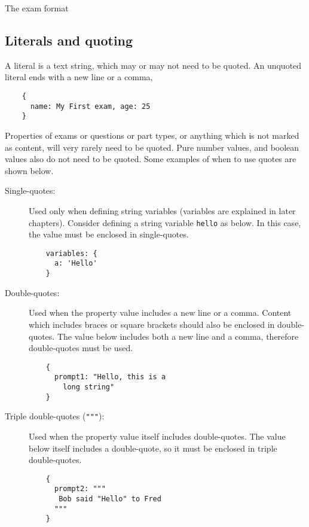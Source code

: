 \begin{chapter}{\label{cha:examformat}The exam format}
  \subsection{\label{sec:literals_quoting}Literals and quoting}
  A literal is a text string, which may or may not need to be quoted.  An
  unquoted literal ends with a new line or a comma, \eg
  \begin{Verbatim}
    {
      name: My First exam, age: 25
    }
  \end{Verbatim}
  Properties of exams or questions or part types, or anything which is not
  marked as content, will very rarely need to be quoted.  Pure number values,
  and boolean values also do not need to be quoted.  Some examples of when to
  use quotes are shown below.
  \begin{description}
    \item[Single-quotes:] Used only when defining string variables (variables
      are explained in later chapters).  Consider defining a string variable
      \verb"hello" as below.  In this case, the value must be enclosed in
      single-quotes.
      \begin{Verbatim}
    variables: {
      a: 'Hello'
    }
      \end{Verbatim}
    \item[Double-quotes:] Used when the property value includes a new line or a
      comma.  Content which includes braces or square brackets should also be
      enclosed in double-quotes.  The value below includes both a new line and
      a comma, therefore double-quotes must be used.
      \begin{Verbatim}
    {
      prompt1: "Hello, this is a
        long string"
    }
      \end{Verbatim}
    \item[Triple double-quotes (\texttt{"""}):] Used when the property value
      itself includes double-quotes.  The value below itself includes
      a double-quote, so it must be enclosed in triple double-quotes.
      \begin{Verbatim}
    {
      prompt2: """
       Bob said "Hello" to Fred
	  """
    }
      \end{Verbatim}
  \end{description}

\end{chapter}

